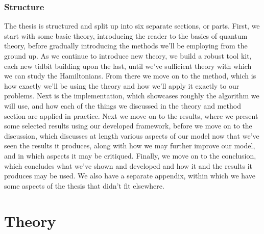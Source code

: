 \documentclass[12pt]{article}
\begin{document}
{\section{Structure}
The thesis is structured and split up into six separate sections, or parts. First, we start with some basic theory, introducing the reader to the basics of quantum theory, before gradually introducing the methods we'll be employing from the ground up. As we continue to introduce new theory, we build a robust tool kit, each new tidbit building upon the last, until we've sufficient theory with which we can study the Hamiltonians.
\newline
From there we move on to the method, which is how exactly we'll be using the theory and how we'll apply it exactly to our problems. Next is the implementation, which showcases roughly the algorithm we will use, and how each of the things we discussed in the theory and method section are applied in practice. \newline
Next we move on to the results, where we present some selected results using our developed framework, before we move on to the discussion, which discusses at length various aspects of our model now that we've seen the results it produces, along with how we may further improve our model, and in which aspects it may be critiqued. \newline
Finally, we move on to the conclusion, which concludes what we've shown and developed and how it and the results it produces may be used.
\newline
We also have a separate appendix, within which we have some aspects of the thesis that didn't fit elsewhere.
\newpage
~\newpage
\part{Theory}
}
\end{document}
